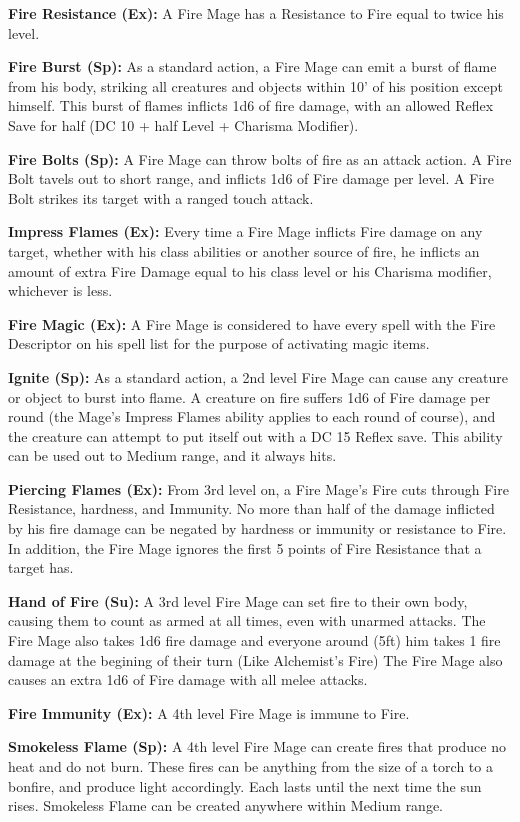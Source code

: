 \textbf{Fire Resistance (Ex):} A Fire Mage has a Resistance to Fire equal to twice his level.

\textbf{Fire Burst (Sp):} As a standard action, a Fire Mage can emit a burst of flame from his body, striking all creatures and objects within 10' of his position except himself. This burst of flames inflicts 1d6 of fire damage, with an allowed Reflex Save for half (DC 10 + half Level + Charisma Modifier).

\textbf{Fire Bolts (Sp):} A Fire Mage can throw bolts of fire as an attack action. A Fire Bolt tavels out to short range, and inflicts 1d6 of Fire damage per level. A Fire Bolt strikes its target with a ranged touch attack.

\textbf{Impress Flames (Ex):} Every time a Fire Mage inflicts Fire damage on any target, whether with his class abilities or another source of fire, he inflicts an amount of extra Fire Damage equal to his class level or his Charisma modifier, whichever is less.

\textbf{Fire Magic (Ex):} A Fire Mage is considered to have every spell with the Fire Descriptor on his spell list for the purpose of activating magic items.

\textbf{Ignite (Sp):} As a standard action, a 2nd level Fire Mage can cause any creature or object to burst into flame. A creature on fire suffers 1d6 of Fire damage per round (the Mage's Impress Flames ability applies to each round of course), and the creature can attempt to put itself out with a DC 15 Reflex save. This ability can be used out to Medium range, and it always hits.

\textbf{Piercing Flames (Ex):} From 3rd level on, a Fire Mage's Fire cuts through Fire Resistance, hardness, and Immunity. No more than half of the damage inflicted by his fire damage can be negated by hardness or immunity or resistance to Fire. In addition, the Fire Mage ignores the first 5 points of Fire Resistance that a target has.

\textbf{Hand of Fire (Su):} A 3rd level Fire Mage can set fire to their own body, causing them to count as armed at all times, even with unarmed attacks. The Fire Mage also takes 1d6 fire damage and everyone around (5ft) him takes 1 fire damage at the begining of their turn (Like Alchemist’s Fire) The Fire Mage also causes an extra 1d6 of Fire damage with all melee attacks.

\textbf{Fire Immunity (Ex):} A 4th level Fire Mage is immune to Fire.

\textbf{Smokeless Flame (Sp):} A 4th level Fire Mage can create fires that produce no heat and do not burn. These fires can be anything from the size of a torch to a bonfire, and produce light accordingly. Each lasts until the next time the sun rises. Smokeless Flame can be created anywhere within Medium range.

